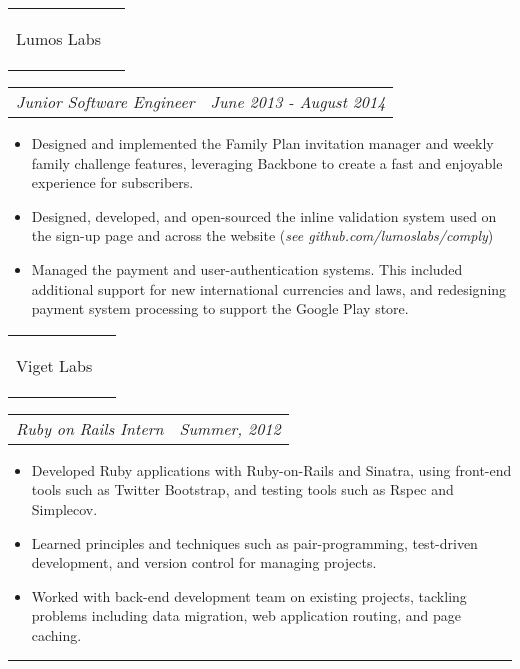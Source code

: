 \documentclass[11pt]{article}
\makeatletter
\newcommand{\headerrow}[2]
{\begin{tabular*}{\linewidth}{l@{\extracolsep{\fill}}r}
	#1 &
	#2 \\
\end{tabular*}}
\makeatother
\begin{document}
	\headerrow
		{\begin{Large}Lumos Labs\end{Large}}
		{}
	\headerrow
		{\textit{Junior Software Engineer}}
		{\textit{June 2013 - August 2014}}
	\begin{itemize}
		\item Designed and implemented the Family Plan invitation manager and weekly family challenge features, leveraging Backbone to create a fast and enjoyable experience for subscribers.
		\vspace{-0.8em}
		\item Designed, developed, and open-sourced the inline validation system used on the sign-up page and across the website ({\textit{see github.com/lumoslabs/comply}})
		\vspace{-0.8em}
		\item Managed the payment and user-authentication systems. This included additional support for new international currencies and laws, and redesigning payment system processing to support the Google Play store.
	\end{itemize}

	\headerrow
		{\begin{Large}Viget Labs\end{Large}}
		{}
	\headerrow
		{\textit{Ruby on Rails Intern}}
		{\textit{Summer, 2012}}
	\begin{itemize}
		\item Developed Ruby applications with Ruby-on-Rails and Sinatra, using front-end tools such as Twitter Bootstrap, and testing tools such as Rspec and Simplecov.
		\vspace{-0.8em}
		\item Learned principles and techniques such as pair-programming, test-driven development, and version control for managing projects.
		\vspace{-0.8em}
		\item Worked with back-end development team on existing projects, tackling problems including data migration, web application routing, and page caching.
	\end{itemize}

\hrule
\vspace{0.5em}
\end{document}
